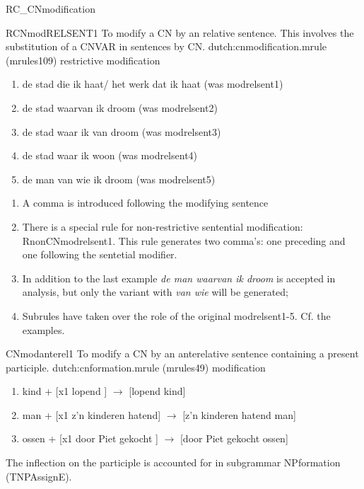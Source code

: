 \begin{mruleclass}{RC\_CNmodification}
\begin{members}
\begin{member}
 RCNmodRELSENT1
 To modify a CN by an relative sentence. This involves the 
substitution of a CNVAR in sentences by CN.
\file dutch:cnmodification.mrule (mrules109)
\semantics restrictive modification
\example \mbox{}
\begin{enumerate}
\item  de stad die ik haat/ het werk dat ik haat (was modrelsent1)
\item  de stad waarvan ik droom (was modrelsent2)
\item  de stad waar ik van droom (was modrelsent3)
\item  de stad waar ik woon (was modrelsent4)
\item  de man van wie ik droom (was modrelsent5)
\end{enumerate}
\remarks\mbox{}
\begin{enumerate}
  \item 
A comma is introduced following the modifying sentence
  \item 
There is a special rule for non-restrictive sentential modification:
RnonCNmodrelsent1. This rule generates two comma's: one preceding and one 
following the sentetial modifier.
  \item 

In addition to the last example
{\em de man waarvan ik droom} is accepted in analysis, but only the 
variant with 
{\em van wie}
will be  generated;
  \item
Subrules have taken over the role of the original modrelsent1-5. 
Cf. the examples.
\end{enumerate}
\end{member}
\begin{member}
 CNmodanterel1
 To modify a CN by an anterelative sentence containing
a present participle.
\file dutch:cnformation.mrule (mrules49)
\semantics modification
\example
\begin{enumerate}
  \item 
kind + [x1 lopend ] $\rightarrow$ [lopend kind]
\item 
man  + [x1 z'n kinderen hatend] $\rightarrow$ [z'n kinderen hatend man]
\item
ossen + [x1 door Piet gekocht ] $\rightarrow$ [door Piet gekocht ossen]
\end{enumerate}
\remarks\mbox{}
The inflection on the participle is accounted for in subgrammar NPformation
(TNPAssignE).
\end{member}
\end{members}
\end{mruleclass}

